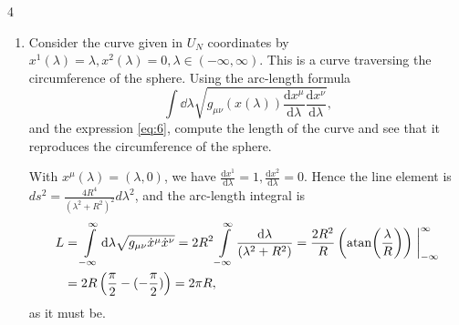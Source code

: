 \documentclass[11pt]{article}
\begin{document}
\begin{problem}{4}
\begin{enumerate}[label=(\alph*)]
\begin{proof}
    Combining \cref{eq:metric-g11,eq:metric-g22,eq:metric-g12}, we have
    \begin{equation}
        \label{eq:stereographic-metric-result}
        \begin{aligned}
            ds^2
            &= g'_{\mu\nu}\,dx^\mu dx^\nu \\
            &= \frac{4R^4}{(r^2+R^2)^2}
               \left((dx^1)^2+(dx^2)^2\right) \\
            &= \frac{4R^4}
               {\left((x^1)^2+(x^2)^2+R^2\right)^2}
               \left((dx^1)^2+(dx^2)^2\right),
        \end{aligned}
    \end{equation}
    as desired.
  \end{proof}

		\item Consider the curve given in \( U_N \) coordinates by \( x^1(\lambda) = \lambda, x^2(\lambda) = 0, \lambda \in (-\infty, \infty) \).
		      This is a curve traversing the circumference of the sphere.
		      Using the arc-length formula
		      \begin{equation}
			      \label{eq:7}
			      \int \dd \lambda \sqrt{g_{\mu\nu}(x(\lambda)) \frac{\mathrm{d} x^{\mu}}{\mathrm{d} \lambda} \frac{\mathrm{d} x^{\nu}}{\mathrm{d} \lambda}},
		      \end{equation}
		      and the expression \cref{eq:6}, compute the length of the curve and see that it reproduces the circumference of the sphere.
          \begin{answer}
            With \( x^{\mu}(\lambda) = (\lambda, 0) \), we have \( \frac{\mathrm{d} x^1}{\mathrm{d} \lambda} = 1, \frac{\mathrm{d} x^{2}}{\mathrm{d} \lambda} = 0 \).
            Hence the line element is \( ds^2 = \frac{4R^4}{(\lambda^2 + R^2)^2}d\lambda^2 \), and the arc-length integral is
            \begin{equation}
            \label{eq:36}
            \begin{aligned}
              L &= \int\limits_{-\infty}^{\infty} \dd \lambda \sqrt{g_{\mu\nu} \dot{x}^{\mu} \dot{x}^{\nu}} = 2R^2 \int\limits_{-\infty}^{\infty} \frac{\dd \lambda}{(\lambda^2 + R^2)} = \frac{2R^2}{R} \left( \atan( \frac{\lambda}{R} ) \right)\eval_{-\infty}^{\infty} \\
              &= 2R \left( \frac{\pi}{2} - (- \frac{\pi}{2}) \right) = 2\pi R,
            \end{aligned}
          \end{equation}
          as it must be.
          \end{answer}
	\end{enumerate}
\end{problem}
\end{document}
